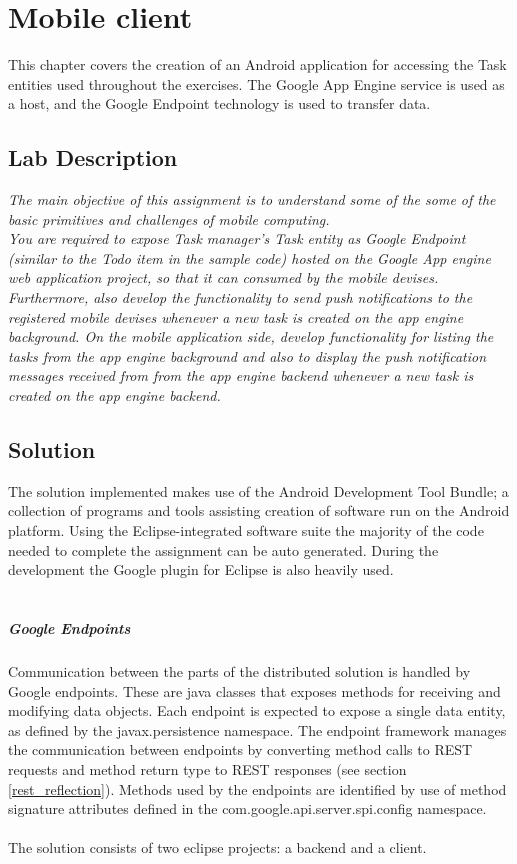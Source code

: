 \chapter{Mobile client}
\minitoc
This chapter covers the creation of an Android application for accessing the Task entities used throughout the exercises. The Google App Engine service is used as a host, and the Google Endpoint technology is used to transfer data.

\section{Lab Description}

\textit{The main objective of this assignment is to understand some of the some of the basic primitives and challenges of mobile computing.\\
You are required to expose Task manager’s Task entity as Google Endpoint (similar to the Todo item in the sample code) hosted on the Google App engine web application project, so that it can consumed by the mobile devises. Furthermore, also develop the functionality to send push notifications to the registered mobile devises whenever a new task is created on the app engine background. On the mobile application side, develop functionality for listing the tasks from the app engine background and also to display the push notification messages received from from the app engine backend whenever a new task is created on the app engine backend.}

\section{Solution}
The solution implemented makes use of the Android Development Tool Bundle; a collection of programs and tools assisting creation of software run on the Android platform. Using the Eclipse-integrated software suite the majority of the code needed to complete the assignment can be auto generated. During the development the Google plugin for Eclipse is also heavily used.\\\\
\paragraph{Google Endpoints} Communication between the parts of the distributed solution is handled by Google endpoints. These are java classes that exposes methods for receiving and modifying data objects. Each endpoint is expected to expose a single data entity, as defined by the javax.persistence namespace. The endpoint framework manages the communication between endpoints by converting method calls to REST requests and method return type to REST responses (see section \ref{rest_reflection}). Methods used by the endpoints are identified by use of method signature attributes defined in the com.google.api.server.spi.config namespace.\\\\
The solution consists of two eclipse projects: a backend and a client.\\
